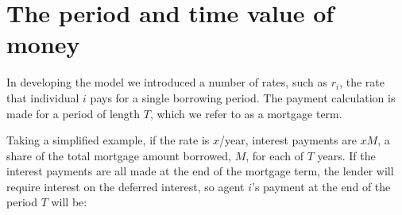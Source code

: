 





\section{The period and time value of money}

In developing the model we introduced a number of rates, such as $r_i$, the rate that individual $i$ pays for a single borrowing period. The payment calculation is made for a period of length $T$, which we refer to as a mortgage term.

Taking a simplified example, if the rate is $x$/year, interest payments are $xM$, a share of the total mortgage amount borrowed, $M$, for each of $T$ years. 
If the interest payments are all made at the end of the mortgage term, the lender will require interest on the deferred interest, so agent $i$'s payment at the end of the period $T$ will be:

